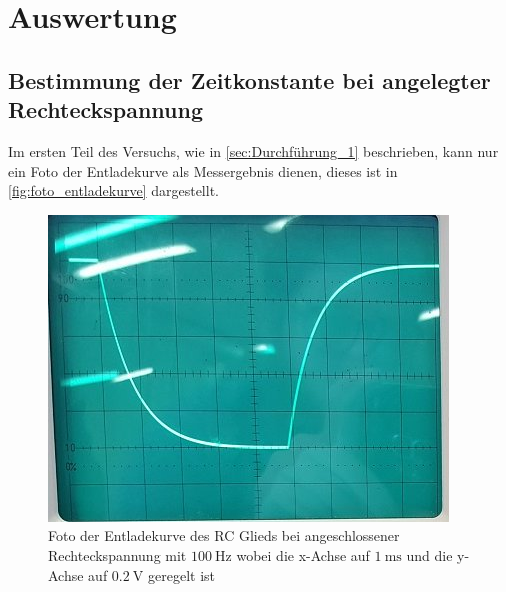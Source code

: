 \section{Auswertung}
\label{sec:Auswertung}



\subsection{Bestimmung der Zeitkonstante bei angelegter Rechteckspannung}
\label{sec:Auswertung_Rechteckspannung}

Im ersten Teil des Versuchs, wie in \autoref{sec:Durchführung_1} beschrieben, kann nur ein Foto der Entladekurve als Messergebnis dienen, dieses ist in \autoref{fig:foto_entladekurve} dargestellt.

\begin{figure}
    \centering
    \includegraphics[width=\textwidth/2]{images/foto_01_ausschnitt.jpg}
    \caption{Foto der Entladekurve des RC Glieds bei angeschlossener Rechteckspannung mit $\SI{100}{\hertz}$ wobei die x-Achse auf $\SI{1}{\milli\second}$ und die y-Achse auf $\SI{0.2}{\volt}$ geregelt ist}
    \label{fig:foto_entladekurve}
\end{figure}

